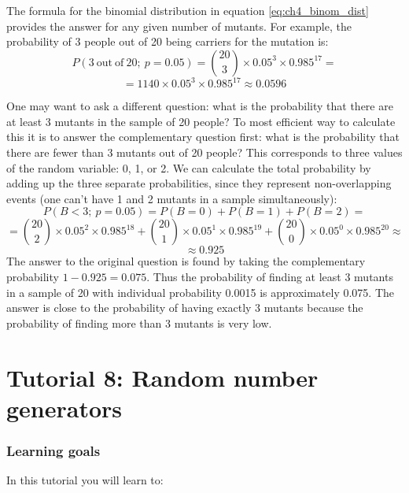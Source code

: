 \documentclass[
  letterpaper,
  DIV=11,
  numbers=noendperiod]{scrreprt}
\begin{document}
The formula for the binomial distribution in equation
\ref{eq:ch4_binom_dist} provides the answer for any given number of
mutants. For example, the probability of 3 people out of 20 being
carriers for the mutation is:
\[P(\mathrm{3 \ out \ of  \ 20}; \ p=0.05) = \binom{20}{3} \times 0.05^3  \times 0.985^{17} =  \]
\[ = 1140 \times 0.05^3 \times 0.985^{17} \approx 0.0596\]

One may want to ask a different question: what is the probability that
there are at least 3 mutants in the sample of 20 people? To most
efficient way to calculate this it is to answer the complementary
question first: what is the probability that there are fewer than 3
mutants out of 20 people? This corresponds to three values of the random
variable: 0, 1, or 2. We can calculate the total probability by adding
up the three separate probabilities, since they represent
non-overlapping events (one can't have 1 and 2 mutants in a sample
simultaneously): \[ P(B < 3; \  p=0.05) = P(B=0) + P(B=1) + P(B=2) = \]
\[ = \binom{20}{2} \times 0.05^2  \times 0.985^{18} +\binom{20}{1} \times 0.05^1  \times 0.985^{19} +\binom{20}{0} \times 0.05^0  \times 0.985^{20} \approx \]
\[ \approx 0.925 \] The answer to the original question is found by
taking the complementary probability \(1-0.925=0.075\). Thus the
probability of finding at least 3 mutants in a sample of 20 with
individual probability 0.0015 is approximately 0.075. The answer is
close to the probability of having exactly 3 mutants because the
probability of finding more than 3 mutants is very low.


\hypertarget{tutorial-8-random-number-generators}{%
\chapter*{Tutorial 8: Random number
generators}\label{tutorial-8-random-number-generators}}


\hypertarget{learning-goals-4}{%
\subsection*{Learning goals}\label{learning-goals-4}}

In this tutorial you will learn to:
\end{document}
